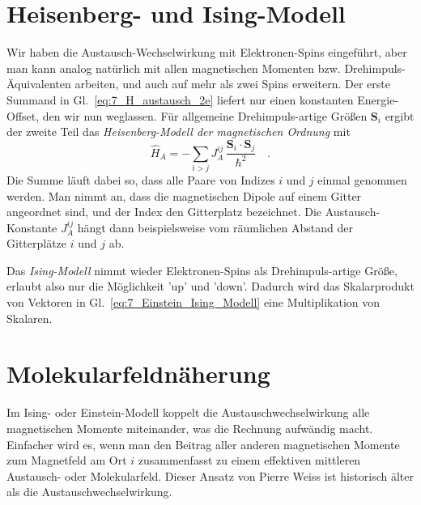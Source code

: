 \section{Heisenberg- und Ising-Modell}

Wir haben die  Austausch-Wechselwirkung mit Elektronen-Spins eingeführt, aber man kann analog natürlich mit allen magnetischen Momenten bzw. Drehimpuls-Äquivalenten arbeiten, und auch auf mehr als zwei Spins erweitern. Der erste Summand in Gl.~\ref{eq:7_H_austausch_2e} liefert nur einen konstanten Energie-Offset, den wir nun weglassen.  Für allgemeine Drehimpuls-artige Größen $\bm{S}_i$ ergibt der zweite Teil das \emph{Heisenberg-Modell der magnetischen Ordnung} mit
\begin{equation}
    \hat{H}_A = - \sum_{i > j} J_A^{ij} \, \frac{\bm{S}_i \cdot \bm{S}_j}{\hbar^2}  \quad .
    \label{eq:7_Einstein_Ising_Modell}
\end{equation}
Die Summe läuft dabei so, dass alle Paare von Indizes $i$ und $j$ einmal genommen werden. Man nimmt an, dass die magnetischen Dipole auf einem Gitter angeordnet  sind, und der Index den Gitterplatz bezeichnet. Die Austausch-Konstante $J_A^{ij}$ hängt dann beispielsweise vom räumlichen Abstand der Gitterplätze  $i$ und $j$ ab.

Das \emph{Ising-Modell} nimmt wieder Elektronen-Spins als Drehimpuls-artige Größe, erlaubt also nur die Möglichkeit 'up' und 'down'. Dadurch wird das Skalarprodukt von Vektoren  in Gl.~\ref{eq:7_Einstein_Ising_Modell} eine Multiplikation von Skalaren. 


\section{Molekularfeldnäherung}


Im Ising- oder Einstein-Modell koppelt die Austauschwechselwirkung alle magnetischen Momente miteinander, was die Rechnung aufwändig macht. Einfacher wird es, wenn man den Beitrag aller anderen magnetischen Momente zum Magnetfeld am Ort $i$ zusammenfasst zu einem effektiven mittleren Austausch- oder Molekularfeld. Dieser Ansatz von Pierre Weiss ist historisch älter als die Austauschwechselwirkung.

